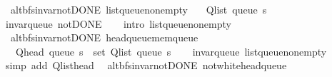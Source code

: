 \begin{isabellebody}
\isanewline
%
\endisadelimproof
\isanewline
{}\isamarkupfalse%
\ {\isacharparenleft}{\kern0pt}\ alt{\isacharunderscore}{\kern0pt}bfs{\isacharunderscore}{\kern0pt}invar{\isacharunderscore}{\kern0pt}not{\isacharunderscore}{\kern0pt}DONE{\isacharparenright}{\kern0pt}\ list{\isacharunderscore}{\kern0pt}queue{\isacharunderscore}{\kern0pt}non{\isacharunderscore}{\kern0pt}empty{\isacharcolon}{\kern0pt}\isanewline
\ \ \ {\isachardoublequoteopen}Q{\isacharunderscore}{\kern0pt}list\ {\isacharparenleft}{\kern0pt}queue\ s{\isacharparenright}{\kern0pt}\ {\isasymnoteq}\ {\isacharbrackleft}{\kern0pt}{\isacharbrackright}{\kern0pt}{\isachardoublequoteclose}\isanewline
%
\isadelimproof
\ \ %
\endisadelimproof
%
\isatagproof
{}\isamarkupfalse%
\ invar{\isacharunderscore}{\kern0pt}queue\ not{\isacharunderscore}{\kern0pt}DONE\isanewline
\ \ \isamarkupfalse%
\ {\isacharparenleft}{\kern0pt}intro\ list{\isacharunderscore}{\kern0pt}queue{\isacharunderscore}{\kern0pt}non{\isacharunderscore}{\kern0pt}empty{\isacharparenright}{\kern0pt}%
\endisatagproof
{\isafoldproof}%
%
\isadelimproof
\isanewline
%
\endisadelimproof
\isanewline
{}\isamarkupfalse%
\ {\isacharparenleft}{\kern0pt}\ alt{\isacharunderscore}{\kern0pt}bfs{\isacharunderscore}{\kern0pt}invar{\isacharunderscore}{\kern0pt}not{\isacharunderscore}{\kern0pt}DONE{\isacharparenright}{\kern0pt}\ head{\isacharunderscore}{\kern0pt}queue{\isacharunderscore}{\kern0pt}mem{\isacharunderscore}{\kern0pt}queue{\isacharcolon}{\kern0pt}\isanewline
\ \ \ {\isachardoublequoteopen}Q{\isacharunderscore}{\kern0pt}head\ {\isacharparenleft}{\kern0pt}queue\ s{\isacharparenright}{\kern0pt}\ {\isasymin}\ set\ {\isacharparenleft}{\kern0pt}Q{\isacharunderscore}{\kern0pt}list\ {\isacharparenleft}{\kern0pt}queue\ s{\isacharparenright}{\kern0pt}{\isacharparenright}{\kern0pt}{\isachardoublequoteclose}\isanewline
%
\isadelimproof
\ \ %
\endisadelimproof
%
\isatagproof
{}\isamarkupfalse%
\ invar{\isacharunderscore}{\kern0pt}queue\ list{\isacharunderscore}{\kern0pt}queue{\isacharunderscore}{\kern0pt}non{\isacharunderscore}{\kern0pt}empty\isanewline
\ \ \isamarkupfalse%
\ {\isacharparenleft}{\kern0pt}simp\ add{\isacharcolon}{\kern0pt}\ Q{\isachardot}{\kern0pt}list{\isacharunderscore}{\kern0pt}head{\isacharparenright}{\kern0pt}%
\endisatagproof
{\isafoldproof}%
%
\isadelimproof
\isanewline
%
\endisadelimproof
\isanewline
{}\isamarkupfalse%
\ {\isacharparenleft}{\kern0pt}\ alt{\isacharunderscore}{\kern0pt}bfs{\isacharunderscore}{\kern0pt}invar{\isacharunderscore}{\kern0pt}not{\isacharunderscore}{\kern0pt}DONE{\isacharparenright}{\kern0pt}\ not{\isacharunderscore}{\kern0pt}white{\isacharunderscore}{\kern0pt}head{\isacharunderscore}{\kern0pt}queue{\isacharcolon}{\kern0pt}\isanewline

\end{isabellebody}
